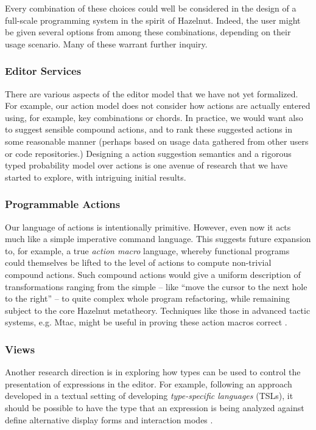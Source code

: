 \documentclass[9pt]{sigplanconf}
\begin{document}
Every combination of these choices could well be considered in the design
of a full-scale programming system in the spirit of Hazelnut. Indeed, the
user might be given several options from among these combinations,
depending on their usage scenario. Many of these warrant further inquiry.


\subsubsection{Editor Services}
There are various aspects of the editor model that we have not yet
formalized. For example, our action model does not consider how actions are
actually entered using, for example, key combinations or chords. In
practice, we would want also to suggest sensible compound actions, and 
to rank these suggested actions in some reasonable
manner (perhaps based on usage data gathered from other users or code
repositories.) Designing a action suggestion semantics and a rigorous typed probability model over actions is one avenue of research that we have started to
explore, with intriguing initial results.

\subsubsection{Programmable Actions}
Our language of actions is intentionally primitive. However, even now it
acts much like a simple imperative command language. This suggests future
expansion to, for example, a true \emph{action macro} language, whereby
functional programs could themselves be lifted to the level of actions to
compute non-trivial compound actions. Such compound actions would give a
uniform description of transformations ranging from the simple -- like
``move the cursor to the next hole to the right'' -- to quite complex whole
program refactoring, while remaining subject to the core Hazelnut
metatheory. Techniques like those in advanced tactic systems, e.g. Mtac, might be useful 
in proving these action macros correct \cite{ziliani2015mtac}.

\subsubsection{Views}
Another research direction is in exploring how types can be used to control
the presentation of expressions in the editor. For example, following an
approach developed in a textual setting of developing \emph{type-specific
languages} (TSLs), it should be possible to have the type that an
expression is being analyzed against define alternative display forms and
interaction modes \cite{TSLs}.
\end{document}
